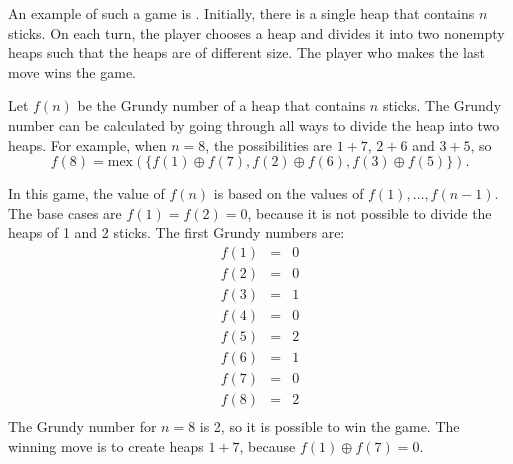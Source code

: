 
An example of such a game is .
Initially, there is a single heap that contains $n$ sticks.
On each turn, the player chooses a heap and divides
it into two nonempty heaps such that the heaps
are of different size.
The player who makes the last move wins the game.

Let $f(n)$ be the Grundy number of a heap
that contains $n$ sticks.
The Grundy number can be calculated by going
through all ways to divide the heap into
two heaps.
For example, when $n=8$, the possibilities
are $1+7$, $2+6$ and $3+5$, so
\[f(8)=\textrm{mex}(\{f(1) \oplus f(7), f(2) \oplus f(6), f(3) \oplus f(5)\}).\]

In this game, the value of $f(n)$ is based on the values
of $f(1),\ldots,f(n-1)$.
The base cases are $f(1)=f(2)=0$,
because it is not possible to divide the heaps
of 1 and 2 sticks.
The first Grundy numbers are:
\[
\begin{array}{lcl}
f(1) & = & 0 \\
f(2) & = & 0 \\
f(3) & = & 1 \\
f(4) & = & 0 \\
f(5) & = & 2 \\
f(6) & = & 1 \\
f(7) & = & 0 \\
f(8) & = & 2 \\
\end{array}
\]
The Grundy number for $n=8$ is 2,
so it is possible to win the game.
The winning move is to create heaps
$1+7$, because $f(1) \oplus f(7) = 0$.

